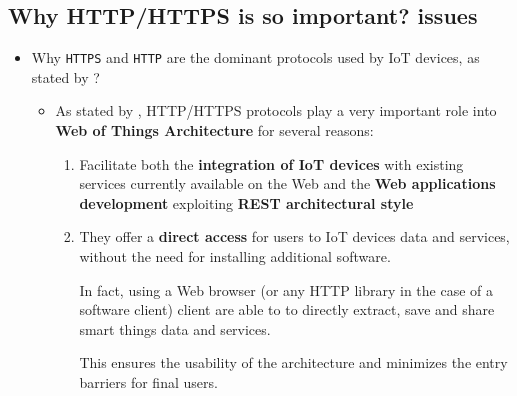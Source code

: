 \documentclass[10pt]{beamer}
\begin{document}
\subsection{Why HTTP/HTTPS is so important? issues}
\begin{frame}{}
\begin{itemize}

\item Why \texttt{HTTPS} and \texttt{HTTP} are the dominant protocols used by IoT devices, as stated by \citet{ITPAReport}?

\begin{itemize}
\item As stated by \citet{WOT}, HTTP/HTTPS protocols play a very important role into \textbf{Web of Things Architecture} for several reasons:
\begin{enumerate}
\item Facilitate both the \textbf{integration of IoT devices} with existing services currently available on the Web and the  \textbf{Web applications development} exploiting \textbf{REST architectural style}

\item They offer a \textbf{direct access} for users to IoT devices data and services, without the need for installing additional software. 

In fact, using a Web browser (or any HTTP library in the case of a software client) client are able to to directly extract, save and share smart things data and services. 

This ensures the usability of the architecture and minimizes the entry barriers for final users.
\end{enumerate}



\end{itemize}

\end{itemize}
\end{frame} 
\end{document}
